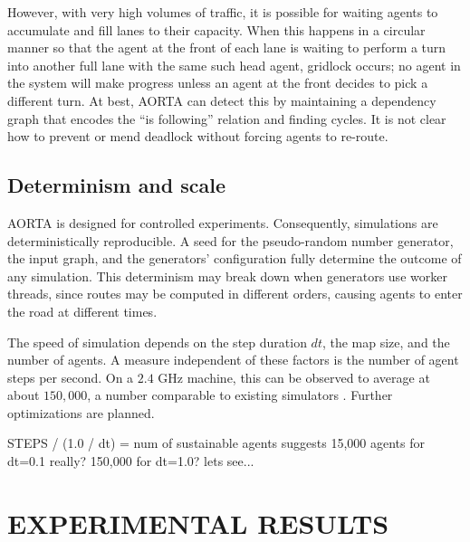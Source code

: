 \documentclass[letterpaper, 10 pt, conference]{ieeeconf}  %
\begin{document}
However, with very high volumes of traffic, it is possible for waiting agents to
accumulate and fill lanes to their capacity. When this happens in a circular
manner so that the agent at the front of each lane is waiting to perform a turn
into another full lane with the same such head agent, gridlock \cite{gridlock}
occurs; no agent in the system will make progress unless an agent at the front
decides to pick a different turn. At best, AORTA can detect this by maintaining
a dependency graph that encodes the ``is following'' relation and finding
cycles. It is not clear how to prevent or mend deadlock without forcing
agents to re-route.


\subsection{Determinism and scale}

AORTA is designed for controlled experiments. Consequently, simulations are
deterministically reproducible. A seed for the pseudo-random number generator,
the input graph, and the generators' configuration fully determine the outcome of any
simulation. This determinism may break down when generators use worker threads,
since routes may be computed in different orders, causing agents to enter the
road at different times.



The speed of simulation depends on the step duration $dt$, the map size, and the
number of agents. A measure independent of these factors is the number of agent
steps per second. On a $2.4$ GHz machine, this can be observed to average at
about $150,000$, a number comparable to existing simulators \cite{SUMOthesis}.
Further optimizations are planned.

STEPS / (1.0 / dt) = num of sustainable agents
  suggests 15,000 agents for dt=0.1
  really? 150,000 for dt=1.0? lets see...


\section{EXPERIMENTAL RESULTS}
\label{sec:results}
\end{document}
